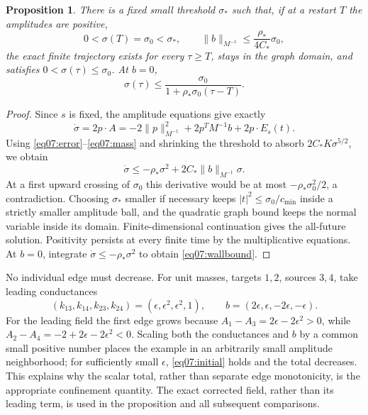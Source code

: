 \documentclass[11pt]{amsart}
\newtheorem{proposition}[theorem]{Proposition}
\theoremstyle{definition}
\theoremstyle{remark}
\begin{document}
\begin{proposition}\label{prop07:confinement}
There is a fixed small threshold \(\sigma_*\) such that, if at a
restart \(T\) the amplitudes are positive,
\begin{equation}\label{eq07:initial}
 0<\sigma(T)=\sigma_0<\sigma_*,\qquad
 \|b\|_{M^{-1}}\le\frac{\rho_*}{4C_*}\sigma_0,
\end{equation}
the exact finite trajectory exists for every \(\tau\ge T\), stays
in the graph domain, and satisfies \(0<\sigma(\tau)\le\sigma_0\).
At \(b=0\),
\begin{equation}\label{eq07:wallbound}
 \sigma(\tau)\le\frac{\sigma_0}{1+\rho_*\sigma_0(\tau-T)}.
\end{equation}
\end{proposition}

\begin{proof}
Since \(s\) is fixed, the amplitude equations give exactly
\[
 \dot\sigma=2p\cdot A
  =-2\|p\|_{M^{-1}}^2+2p^TM^{-1}b+2p\cdot E_s(t).
\]
Using \eqref{eq07:error}--\eqref{eq07:mass} and shrinking the
threshold to absorb \(2C_*K\sigma^{5/2}\), we obtain
\begin{equation}\label{eq07:logisticbound}
 \dot\sigma\le-\rho_*\sigma^2+2C_*\|b\|_{M^{-1}}\sigma.
\end{equation}
At a first upward crossing of \(\sigma_0\) this derivative would
be at most \(-\rho_*\sigma_0^2/2\), a contradiction. Choosing
\(\sigma_*\) smaller if necessary keeps
\(|t|^2\le\sigma_0/c_{\min}\) inside a strictly smaller amplitude
ball, and the quadratic graph bound keeps the normal variable
inside its domain. Finite-dimensional continuation gives the
all-future solution. Positivity persists at every finite time by
the multiplicative equations. At \(b=0\), integrate
\(\dot\sigma\le-\rho_*\sigma^2\) to obtain
\eqref{eq07:wallbound}.
\end{proof}

No individual edge must decrease. For unit masses, targets \(1,2\),
sources \(3,4\), take leading conductances
\[
 (k_{13},k_{14},k_{23},k_{24})
     =(\epsilon,\epsilon^2,\epsilon^2,1),\qquad
 b=(2\epsilon,\epsilon,-2\epsilon,-\epsilon).
\]
For the leading field the first edge grows because
\(A_1-A_3=2\epsilon-2\epsilon^2>0\), while
\(A_2-A_4=-2+2\epsilon-2\epsilon^2<0\). Scaling both the
conductances and \(b\) by a common small positive number places
the example in an arbitrarily small amplitude neighborhood; for
sufficiently small \(\epsilon\), \eqref{eq07:initial} holds and
the total decreases. This explains why the scalar total, rather
than separate edge monotonicity, is the appropriate confinement
quantity. The exact corrected field, rather than its leading term,
is used in the proposition and all subsequent comparisons.
\end{document}
